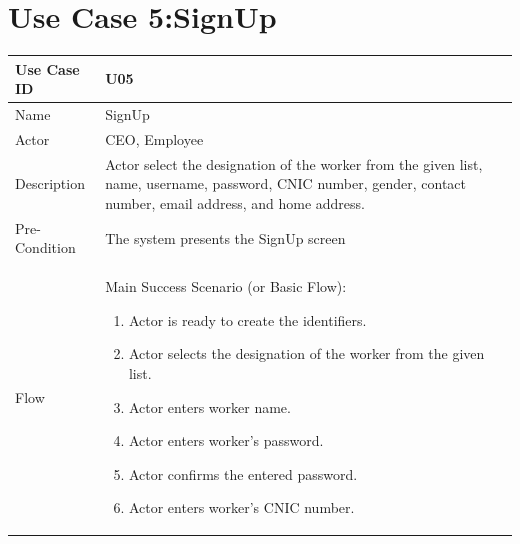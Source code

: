 \documentclass[12pt,a4paper]{report}
\begin{document}
\section{Use Case 5:SignUp}
\begin{tabular}{ | m{3cm} | m{12cm}| } \hline
Use Case ID & U05   \\\hline
Name  &  SignUp \\ \hline
Actor &    CEO, Employee \\ \hline
Description & Actor select the designation of the worker from the given list, name, username, password, CNIC number, gender, contact number, email address, and home address.\\ \hline
Pre-Condition & The system presents the SignUp screen \\\hline
Flow & Main Success Scenario (or Basic Flow):
\begin{enumerate}
\item Actor is ready to create the identifiers.   
\item Actor selects the designation of the worker from the given list. 
\item Actor enters worker name.
\item Actor enters worker's password.
\item Actor confirms the entered password.
\item Actor enters worker's CNIC number.
\end{enumerate}\\ \hline
\end{tabular}
\end{document}
